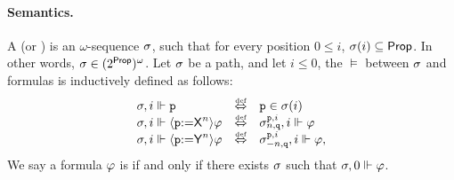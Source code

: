 \paragraph{Semantics.} A  (or ) is an $\omega$-sequence $\sigma$, such that for every position $0\leq i$, $\sigma(i) \subseteq {\rm \sf Prop}$. In other words, $\sigma\in(2^{\rm \sf Prop})^\omega$. 
Let $\sigma$ be a path, and let $i\leq 0$, the  $\models$ between $\sigma$ and formulas is inductively defined as follows:
\[
\begin{array}{lcl}
\apath,i \models \avarprop & \iffdef & \avarprop\in\apath(i) \\
\apath,i \models \Assign{\avarprop}{\Nextn}\aformula & \iffdef & \apath^{\avarprop,i}_{n,\avarpropbis},i \models \aformula \\ 
\apath,i \models \Assign{\avarprop}{\Prevn}\aformula & \iffdef & \apath^{\avarprop,i}_{{-}n,\avarpropbis},i \models \aformula,
\end{array}
\]
We say a formula $\varphi$ is  if and only if there exists $\sigma$ such that $\sigma,0\Vdash\varphi$.

